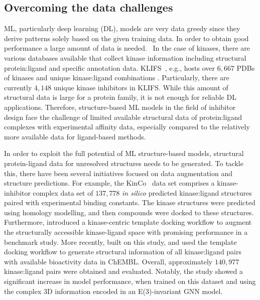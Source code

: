 \documentclass[9pt,lessons]{livecoms}
\begin{document}
\subsection{Overcoming the data challenges}
ML, particularly deep learning (DL), models are very data greedy since they derive patterns solely based on the given training data. In order to obtain good performance a large amount of data is needed.~\cite{kimber2021deep} In the case of kinases, there are various databases available that collect kinase information including structural protein:ligand and specific annotation data. KLIFS~\cite{kooistra2016klifs}, e.g., hosts over $6,667$ PDBs of kinases and unique kinase:ligand combinations \cite{Kanev2020}. Particularly, there are currently $4,148$ unique kinase inhibitors in KLIFS. While this amount of structural data is large for a protein family, it is not enough for reliable DL applications. Therefore, structure-based ML models in the field of inhibitor design face the challenge of limited available structural data of protein:ligand complexes with experimental affinity data, especially compared to the relatively more available data for ligand-based methods.

In order to exploit the full potential of ML structure-based models, structural protein-ligand data for unresolved structures needs to be generated. 
To tackle this, there have been several initiatives focused on data augmentation and structure predictions. 
For example, the KinCo~\cite{liu2023hybrid} data set comprises a kinase-inhibitor complex data set of $137,778$ \textit{in silico} predicted kinase:ligand structures paired with experimental binding constants. 
The kinase structures were predicted using homology modelling, and then compounds were docked to these structures. Furthermore, \citet{schaller2023benchmarking} introduced a kinase-centric template docking workflow to augment the structurally accessible kinase-ligand space with promising performance in a benchmark study. 
More recently, \citet{backenkohler2023guided} built on this study, and used the template docking workflow to generate structural information of all kinase:ligand pairs with available bioactivity data in ChEMBL.
Overall, approximately $140,977$ kinase:ligand pairs were obtained and evaluated.
Notably, the study showed a significant increase in model performance, when trained on this dataset and using the complex 3D information encoded in an E(3)-invariant GNN model.
\end{document}
